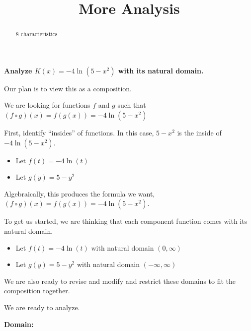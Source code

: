 \documentclass{ximera}
\title{More Analysis}
\begin{document}
\begin{abstract}
8 characteristics
\end{abstract}
\maketitle












\textbf{Analyze $K(x) = -4 \ln(5 - x^2)$ with its natural domain. }







Our plan is to view this as a composition. 






We are looking for functions $f$ and $g$ such that $(f \circ g)(x) = f(g(x)) = -4 \ln(5 - x^2)$ 


First, identify ``insides'' of functions.  In this case, $5 - x^2$ is the inside of $-4 \ln(5 - x^2)$. 



\begin{itemize}
\item Let $f(t) = -4 \ln(t)$ 
\item Let $g(y) = 5 - y^2$ 
\end{itemize}

Algebraically, this produces the formula we want, $(f \circ g)(x) = f(g(x)) = -4 \ln(5 - x^2)$.


To get us started, we are thinking that each component function comes with its natural domain.

\begin{itemize}
\item Let $f(t) = -4 \ln(t)$ with natural domain $(0, \infty)$ 
\item Let $g(y) = 5 - y^2$ with natural domain $(-\infty, \infty)$ 
\end{itemize}

We are also ready to revise and modify and restrict these domains to fit the composition together. 




We are ready to analyze. 




\textbf{\textcolor{blue!55!black}{Domain:}} 
\end{document}
